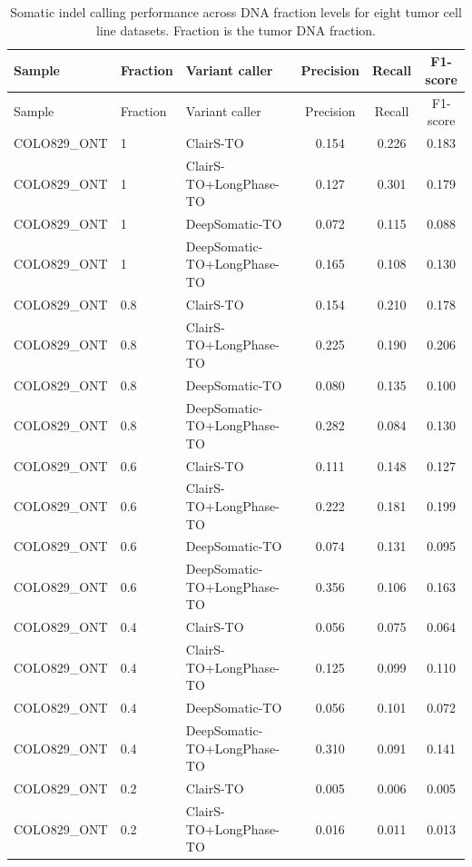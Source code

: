 \documentclass[pdflatex,sn-nature]{sn-jnl}
\begin{document}
\FloatBarrier
{\small
\begin{longtable}{@{}lllccc@{}}
  \caption[Somatic indel calling performance across DNA fraction levels]%
  {Somatic indel calling performance across DNA fraction levels for eight tumor cell line
  datasets. Fraction is the tumor DNA fraction.}
  \label{tab:somatic_indel_purity}\\
  \toprule
  Sample & Fraction & Variant caller & Precision & Recall & F1-score \\
  \midrule
  \endfirsthead
  \toprule
  Sample & Fraction & Variant caller & Precision & Recall & F1-score \\
  \midrule
  \endhead
  \bottomrule
  \endlastfoot
  COLO829\_ONT & 1 & ClairS-TO & 0.154 & 0.226 & 0.183 \\
  COLO829\_ONT & 1 & ClairS-TO+LongPhase-TO & 0.127 & 0.301 & 0.179 \\
  COLO829\_ONT & 1 & DeepSomatic-TO & 0.072 & 0.115 & 0.088 \\
  COLO829\_ONT & 1 & DeepSomatic-TO+LongPhase-TO & 0.165 & 0.108 & 0.130 \\
  COLO829\_ONT & 0.8 & ClairS-TO & 0.154 & 0.210 & 0.178 \\
  COLO829\_ONT & 0.8 & ClairS-TO+LongPhase-TO & 0.225 & 0.190 & 0.206 \\
  COLO829\_ONT & 0.8 & DeepSomatic-TO & 0.080 & 0.135 & 0.100 \\
  COLO829\_ONT & 0.8 & DeepSomatic-TO+LongPhase-TO & 0.282 & 0.084 & 0.130 \\
  COLO829\_ONT & 0.6 & ClairS-TO & 0.111 & 0.148 & 0.127 \\
  COLO829\_ONT & 0.6 & ClairS-TO+LongPhase-TO & 0.222 & 0.181 & 0.199 \\
  COLO829\_ONT & 0.6 & DeepSomatic-TO & 0.074 & 0.131 & 0.095 \\
  COLO829\_ONT & 0.6 & DeepSomatic-TO+LongPhase-TO & 0.356 & 0.106 & 0.163 \\
  COLO829\_ONT & 0.4 & ClairS-TO & 0.056 & 0.075 & 0.064 \\
  COLO829\_ONT & 0.4 & ClairS-TO+LongPhase-TO & 0.125 & 0.099 & 0.110 \\
  COLO829\_ONT & 0.4 & DeepSomatic-TO & 0.056 & 0.101 & 0.072 \\
  COLO829\_ONT & 0.4 & DeepSomatic-TO+LongPhase-TO & 0.310 & 0.091 & 0.141 \\
  COLO829\_ONT & 0.2 & ClairS-TO & 0.005 & 0.006 & 0.005 \\
  COLO829\_ONT & 0.2 & ClairS-TO+LongPhase-TO & 0.016 & 0.011 & 0.013 \\

\end{longtable}}
\end{document}
